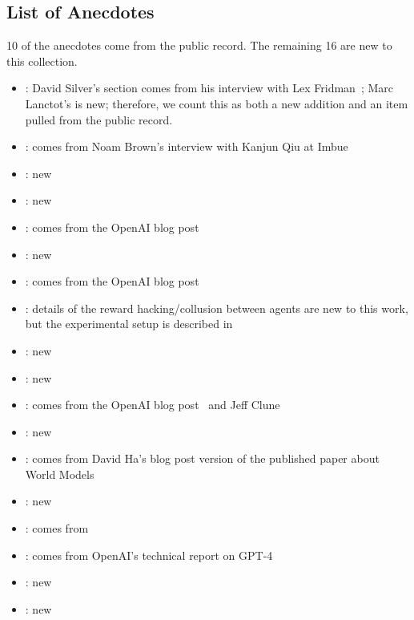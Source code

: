 \newpage

\subsection{List of Anecdotes}

10 of the anecdotes come from the public record. The remaining 16 are new to this collection.

\begin{itemize}
    \item {}: David Silver's section comes from his interview with Lex Fridman~\citep{silverInterviewFridman2020}; Marc Lanctot's is new; therefore, we count this as both a new addition and an item pulled from the public record.
    \item {}: comes from Noam Brown's interview with Kanjun Qiu at Imbue~\citep{KanjunAndNoam}
    \item {}: new
    \item {}: new
    \item {}: comes from the OpenAI blog post~\citep{OpenAI_Faulty_2016}
    \item {}: new
    \item {}: comes from the OpenAI blog post~\citep{OpenAI_Learning_2017}
    \item {}: details of the reward hacking/collusion between agents are new to this work, but the experimental setup is described in \citet{dennis2020emergent}
    \item {}: new
    \item {}: new
    \item {}: comes from the OpenAI blog post~\citep{baker2019emergent} and Jeff Clune
    \item {}: new
    \item {}: comes from David Ha's blog post version of the published paper about World Models~\citep{ha2018world}
    \item {}: new
    \item {}: comes from \citet{BirdRadio}
    \item {}: comes from OpenAI's technical report on GPT-4~\citep{openai2024gpt4, arcUpdateGPT4}
    \item {}: new
    \item {}: new

\end{itemize}
